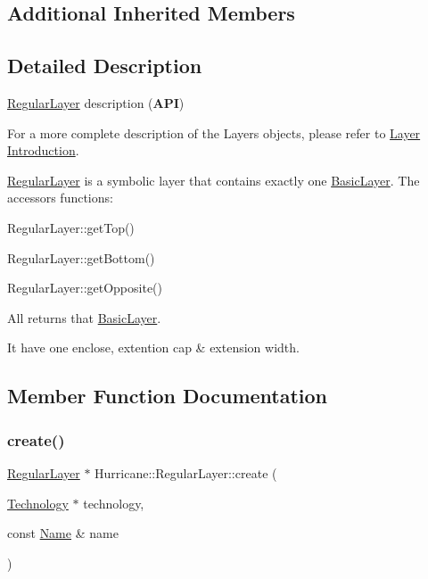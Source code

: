 \subsection*{Additional Inherited Members}


\subsection{Detailed Description}
\hyperlink{classHurricane_1_1RegularLayer}{Regular\+Layer} description ({\bfseries A\+PI}) 

For a more complete description of the Layers objects, please refer to \hyperlink{classHurricane_1_1Layer_secLayerIntro}{Layer Introduction}.

\hyperlink{classHurricane_1_1RegularLayer}{Regular\+Layer} is a symbolic layer that contains exactly one \hyperlink{classHurricane_1_1BasicLayer}{Basic\+Layer}. The accessors functions\+: 
\begin{DoxyItemize}
\item Regular\+Layer\+::get\+Top() 
\item Regular\+Layer\+::get\+Bottom() 
\item Regular\+Layer\+::get\+Opposite() 
\end{DoxyItemize}All returns that \hyperlink{classHurricane_1_1BasicLayer}{Basic\+Layer}.

It have one enclose, extention cap \& extension width. 

\subsection{Member Function Documentation}
\mbox{\label{classHurricane_1_1RegularLayer_a88c2d5516f42b033ae2fdc0797e3dae1}} 
\subsubsection{\texorpdfstring{create()}{create()}}
{\footnotesize\ttfamily \hyperlink{classHurricane_1_1RegularLayer}{Regular\+Layer} $\ast$ Hurricane\+::\+Regular\+Layer\+::create (\begin{DoxyParamCaption}\item[{\hyperlink{classHurricane_1_1Technology}{Technology} $\ast$}]{technology,  }\item[{const \hyperlink{classHurricane_1_1Name}{Name} \&}]{name }\end{DoxyParamCaption})\hspace{0.3cm}{\ttfamily [static]}}

